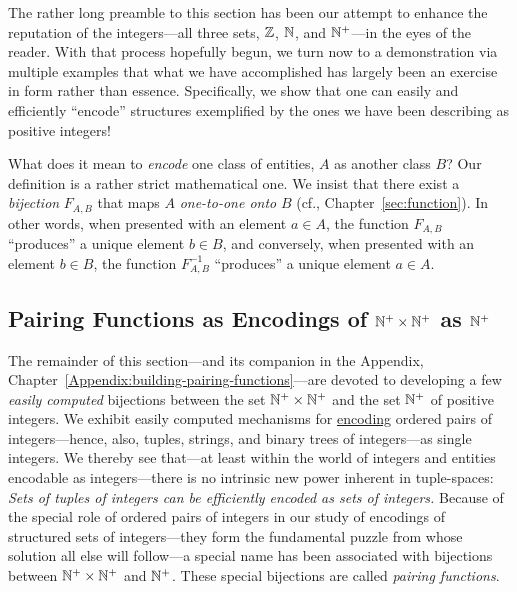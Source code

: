 The rather long preamble to this section has been our attempt to
enhance the reputation of the integers---all three sets, $\mathbb{Z}$, $\mathbb{N}$,
and $\mathbb{N}^+$---in the eyes of the reader.  With that process hopefully
begun, we turn now to a demonstration via multiple examples that what
we have accomplished has largely been an exercise in form rather than
essence.  Specifically, we show that one can easily and efficiently
``encode'' structures exemplified by the ones we have been describing
as positive integers!

\medskip

\noindent
What does it mean to {\em encode}  one class of
  entities, $A$ as another class $B$?  Our definition is a rather
  strict mathematical one.  We insist that there exist a {\em
    bijection} $F_{A,B}$ that maps $A$ {\em one-to-one onto} $B$ (cf.,
  Chapter~\ref{sec:function}).  In other words, when presented with an
  element $a \in A$, the function $F_{A,B}$ ``produces'' a unique
  element $b \in B$, and conversely, when presented with an element $b
  \in B$, the function $F^{-1}_{A,B}$ ``produces'' a unique element $a
  \in A$.



\subsection{Pairing Functions as Encodings of $\mathbb{N}^+ \times \mathbb{N}^+$ as $\mathbb{N}^+$}
\label{sec:building-pairing-functions}

The remainder of this section---and its companion in the Appendix,
Chapter~\ref{Appendix:building-pairing-functions}---are devoted to
developing a few {\em easily computed} bijections between the set
$\mathbb{N}^+ \times \mathbb{N}^+$ and the set $\mathbb{N}^+$ of positive integers.  We
exhibit easily computed mechanisms for \underline{encoding} ordered
pairs of integers---hence, also, tuples, strings, and binary trees of
integers---as single integers.  We thereby see that---at least within
the world of integers and entities encodable as integers---there is no
intrinsic new power inherent in tuple-spaces: 
{\em Sets of tuples of integers can be efficiently encoded as sets of
  integers.}  Because of the special role of ordered pairs of integers
in our study of encodings of structured sets of integers---they form
the fundamental puzzle from whose solution all else will follow---a
special name has been associated with bijections between $\mathbb{N}^+ \times
\mathbb{N}^+$ and $\mathbb{N}^+$.  These special bijections are called {\it pairing
  functions}.  

